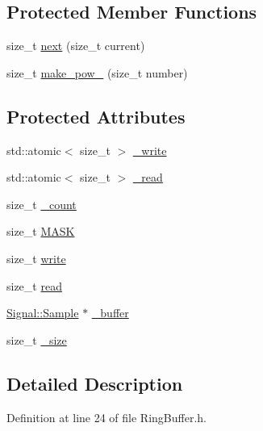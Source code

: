 \subsection*{Protected Member Functions}
\begin{DoxyCompactItemize}
\item 
size\+\_\+t \hyperlink{classDSG_1_1Signal_1_1RingBuffer_a8722b98ad103b14066724927d1b9f5ce}{next} (size\+\_\+t current)
\item 
size\+\_\+t \hyperlink{classDSG_1_1Signal_1_1RingBuffer_a1a68dfd65fec6a6adde136a47e2dd8c4}{make\+\_\+pow\+\_} (size\+\_\+t number)
\end{DoxyCompactItemize}
\subsection*{Protected Attributes}
\begin{DoxyCompactItemize}
\item 
std\+::atomic$<$ size\+\_\+t $>$ \hyperlink{classDSG_1_1Signal_1_1RingBuffer_aa470f52f306c4a5027f4aaeb5cf3110a}{\+\_\+write}
\item 
std\+::atomic$<$ size\+\_\+t $>$ \hyperlink{classDSG_1_1Signal_1_1RingBuffer_a06b511fab5541df586ccd8fb9852d82a}{\+\_\+read}
\item 
size\+\_\+t \hyperlink{classDSG_1_1Signal_1_1RingBuffer_a50a34780ff043ed81b9416462a7092fd}{\+\_\+count}
\item 
size\+\_\+t \hyperlink{classDSG_1_1Signal_1_1RingBuffer_adfa7cc981cbd2693cac87cbef96cf186}{M\+A\+S\+K}
\item 
size\+\_\+t \hyperlink{classDSG_1_1Signal_1_1RingBuffer_ac5309c59a64526cef800f144268a3dbd}{write}
\item 
size\+\_\+t \hyperlink{classDSG_1_1Signal_1_1RingBuffer_afbefc0aade6d73024110d9788245958e}{read}
\item 
\hyperlink{classDSG_1_1Signal_1_1Sample}{Signal\+::\+Sample} $\ast$ \hyperlink{classDSG_1_1Buffer_a67bbd65de494ff2ba6eb950b2b6ff93a}{\+\_\+buffer}
\item 
size\+\_\+t \hyperlink{classDSG_1_1Buffer_a4e2fef9ed617af2554b25c999def8f71}{\+\_\+size}
\end{DoxyCompactItemize}


\subsection{Detailed Description}


Definition at line 24 of file Ring\+Buffer.\+h.



